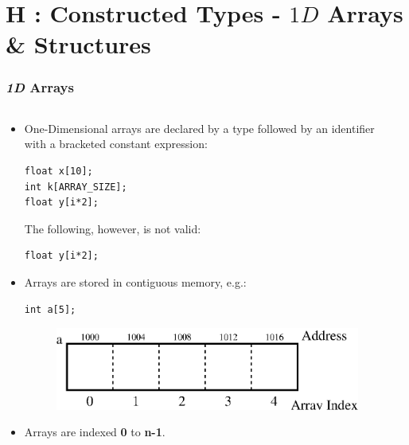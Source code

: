 \section{H : Constructed Types - $1D$ Arrays \& Structures }
\label{chap:contypes}


\begin{frame}[fragile]
\frametitle{{\em 1D} Arrays}
\begin{columns}

\begin{column}{0.55\textwidth}
\begin{itemize}
\item One-Dimensional arrays are declared by a type
followed by an identifier with a bracketed constant expression:
{\small
\begin{verbatim}
float x[10];
int k[ARRAY_SIZE];
float y[i*2];
\end{verbatim}
}
The following, however, is not valid:
{\small
\begin{verbatim}
float y[i*2];
\end{verbatim}
}
\item Arrays are stored in contiguous memory, e.g.:
{\small
\begin{verbatim}
int a[5];
\end{verbatim}
}
\begin{center}
\begin{figure}[h]
\centerline{
\includegraphics[scale=0.40]{../Figs/array9_1.eps}
}
\end{figure}
\end{center}
\item Arrays are indexed {\bf 0} to {\bf n-1}.
\end{itemize}
\end{column}

\begin{column}{0.35\textwidth}

\end{column}

\end{columns}
\end{frame}

